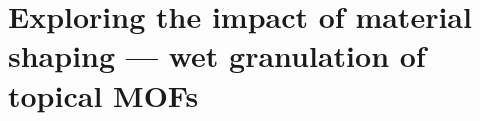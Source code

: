 
\graphicspath{ {\thisch/figures/} }

\chapter{Exploring the impact of material shaping --- wet granulation of topical MOFs}%
\label{shaping}








